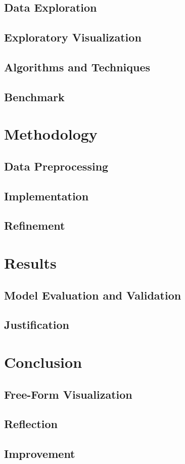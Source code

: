 \documentclass[11pt, a4paper, onecolumn]{article}
\begin{document}
\subsection{Data Exploration}
\subsection{Exploratory Visualization}
\subsection{Algorithms and Techniques}
\subsection{Benchmark}
\section{Methodology}
\subsection{Data Preprocessing}
\subsection{Implementation}
\subsection{Refinement}
\section{Results}
\subsection{Model Evaluation and Validation}
\subsection{Justification}
\section{Conclusion}
\subsection{Free-Form Visualization}
\subsection{Reflection}
\subsection{Improvement}


{}
\end{document}
